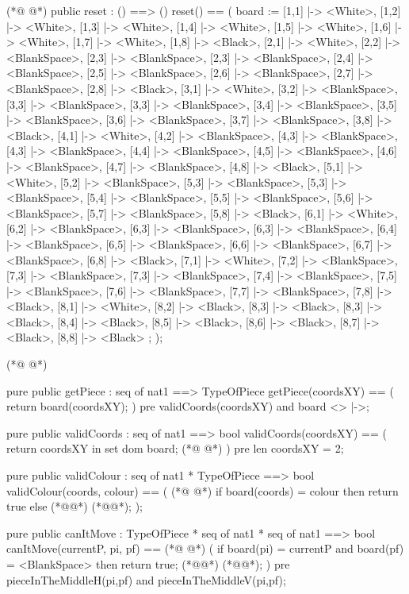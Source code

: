 \begin{vdmpp}[breaklines=true]
(*@
\label{reset:28}
@*)
  public reset : () ==> ()
  reset() ==
  (
    board := {
    [1,1] |-> <White>, [1,2] |-> <White>, [1,3] |-> <White>, [1,4] |-> <White>, [1,5] |-> <White>, [1,6] |-> <White>, [1,7] |-> <White>, [1,8] |-> <Black>,
     [2,1] |-> <White>, [2,2] |-> <BlankSpace>, [2,3] |-> <BlankSpace>, [2,3] |-> <BlankSpace>, [2,4] |-> <BlankSpace>, [2,5] |-> <BlankSpace>, [2,6] |-> <BlankSpace>, [2,7] |-> <BlankSpace>, [2,8] |-> <Black>,
     [3,1] |-> <White>, [3,2] |-> <BlankSpace>, [3,3] |-> <BlankSpace>, [3,3] |-> <BlankSpace>, [3,4] |-> <BlankSpace>, [3,5] |-> <BlankSpace>, [3,6] |-> <BlankSpace>, [3,7] |-> <BlankSpace>, [3,8] |-> <Black>,
     [4,1] |-> <White>, [4,2] |-> <BlankSpace>, [4,3] |-> <BlankSpace>, [4,3] |-> <BlankSpace>, [4,4] |-> <BlankSpace>, [4,5] |-> <BlankSpace>, [4,6] |-> <BlankSpace>, [4,7] |-> <BlankSpace>, [4,8] |-> <Black>,
     [5,1] |-> <White>, [5,2] |-> <BlankSpace>, [5,3] |-> <BlankSpace>, [5,3] |-> <BlankSpace>, [5,4] |-> <BlankSpace>, [5,5] |-> <BlankSpace>, [5,6] |-> <BlankSpace>, [5,7] |-> <BlankSpace>, [5,8] |-> <Black>,
     [6,1] |-> <White>, [6,2] |-> <BlankSpace>, [6,3] |-> <BlankSpace>, [6,3] |-> <BlankSpace>, [6,4] |-> <BlankSpace>, [6,5] |-> <BlankSpace>, [6,6] |-> <BlankSpace>, [6,7] |-> <BlankSpace>, [6,8] |-> <Black>,
     [7,1] |-> <White>, [7,2] |-> <BlankSpace>, [7,3] |-> <BlankSpace>, [7,3] |-> <BlankSpace>, [7,4] |-> <BlankSpace>, [7,5] |-> <BlankSpace>, [7,6] |-> <BlankSpace>, [7,7] |-> <BlankSpace>, [7,8] |-> <Black>,
     [8,1] |-> <White>, [8,2] |-> <Black>, [8,3] |-> <Black>, [8,3] |-> <Black>, [8,4] |-> <Black>, [8,5] |-> <Black>, [8,6] |-> <Black>, [8,7] |-> <Black>, [8,8] |-> <Black>
   };
  );

(*@
\label{getPiece:43}
@*)

 pure public getPiece : seq of nat1 ==> TypeOfPiece
 getPiece(coordsXY) ==
 (
  return board(coordsXY);
 ) 
 pre validCoords(coordsXY) and board <> {|->};
 
 
 pure public validCoords : seq of nat1 ==> bool
 validCoords(coordsXY) ==
 (
  return coordsXY in set dom board;
(*@
\label{validCoords:56}
@*)
 )
 pre len coordsXY = 2;
 
 
 pure public validColour : seq of nat1 * TypeOfPiece ==> bool
 validColour(coords, colour) ==
 (
(*@
\label{validColour:63}
@*)
  if board(coords) = colour
  then return true
  else (*@@*) (*@@*);
 ); 


 pure public canItMove : TypeOfPiece * seq of nat1 * seq of nat1 ==> bool
 canItMove(currentP, pi, pf) ==
(*@
\label{canItMove:71}
@*)
 (
  if board(pi) = currentP and board(pf) = <BlankSpace>
  then return true;
  (*@@*) (*@@*);
 )
 pre pieceInTheMiddleH(pi,pf) and pieceInTheMiddleV(pi,pf);
 

\end{vdmpp}

